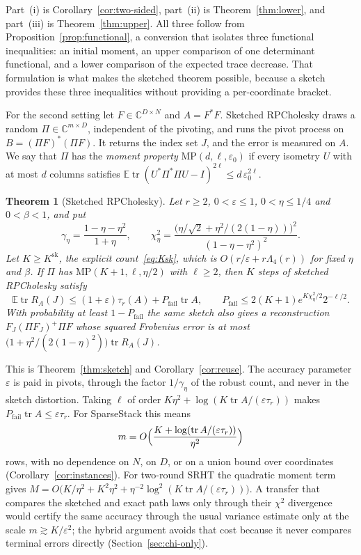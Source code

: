 \documentclass[11pt]{article}
\newtheorem{theorem}{Theorem}[section]
\theoremstyle{definition}\newtheorem{definition}[theorem]{Definition}
\theoremstyle{remark}\newtheorem{remark}[theorem]{Remark}
\newcommand{\C}{\mathbb C}
\newcommand{\E}{\mathbb E}
\newcommand{\eps}{\varepsilon}
\newcommand{\tr}{\operatorname{tr}}
\newcommand{\1}{\mathbf 1}
\newcommand{\MP}{\mathrm{MP}}
\newcommand{\Pfail}{P_{\mathrm{fail}}}
\begin{document}
Part~(i) is Corollary~\ref{cor:two-sided}, part~(ii) is
Theorem~\ref{thm:lower}, and part~(iii) is Theorem~\ref{thm:upper}. All
three follow from Proposition~\ref{prop:functional}, a conversion that
isolates three functional inequalities: an initial moment, an upper
comparison of one determinant functional, and a lower comparison of the
expected trace decrease. That formulation is what makes the sketched
theorem possible, because a sketch provides these three inequalities
without providing a per-coordinate bracket.

For the second setting let $F\in\C^{D\times N}$ and $A=F^*F$. Sketched
RPCholesky draws a random $\Pi\in\C^{m\times D}$, independent of the
pivoting, and runs the pivot process on $B=(\Pi F)^*(\Pi F)$. It returns
the index set $J$, and the error is measured on $A$. We say that $\Pi$
has the \emph{moment property} $\MP(d,\ell,\eps_0)$ if every isometry $U$
with at most $d$ columns satisfies
$\E\tr(U^*\Pi^*\Pi U-I)^{2\ell}\le d\,\eps_0^{2\ell}$.

\begin{theorem}[Sketched RPCholesky]\label{thm:intro-sketch}
Let $r\ge2$, $0<\eps\le1$, $0<\eta\le1/4$ and $0<\beta<1$, and put
\[
 \gamma_\eta=\frac{1-\eta-\eta^2}{1+\eta},\qquad
 \chi_\eta^2=\frac{\bigl(\eta/\sqrt2+\eta^2/(2(1-\eta))\bigr)^2}{(1-\eta-\eta^2)^2}.
\]
Let $K\ge K^{\mathrm{sk}}$, the explicit count~\eqref{eq:Ksk}, which is
$O(r/\eps+r\Lambda_4(r))$ for fixed $\eta$ and $\beta$. If $\Pi$ has
$\MP(K+1,\ell,\eta/2)$ with $\ell\ge2$, then $K$ steps of sketched
RPCholesky satisfy
\[
 \E\tr R_A(J)\le(1+\eps)\tau_r(A)+\Pfail\tr A,\qquad
 \Pfail\le2(K+1)e^{K\chi_\eta^2/2}2^{-\ell/2}.
\]
With probability at least $1-\Pfail$ the same sketch also gives a
reconstruction $F_J(\Pi F_J)^+\Pi F$ whose squared Frobenius error is at
most $\bigl(1+\eta^2/(2(1-\eta)^2)\bigr)\tr R_A(J)$.
\end{theorem}

This is Theorem~\ref{thm:sketch} and Corollary~\ref{cor:reuse}. The
accuracy parameter $\eps$ is paid in pivots, through the factor
$1/\gamma_\eta$ of the robust count, and never in the sketch distortion.
Taking $\ell$ of order $K\eta^2+\log(K\tr A/(\eps\tau_r))$ makes
$\Pfail\tr A\le\eps\tau_r$. For SparseStack this means
\[
 m=O\Bigl(\frac{K+\log(\tr A/(\eps\tau_r))}{\eta^2}\Bigr)
\]
rows, with no dependence on $N$, on $D$, or on a union bound over
coordinates (Corollary~\ref{cor:instances}). For two-round SRHT the
quadratic moment term gives
$M=O\bigl(K/\eta^2+K^2\eta^2+\eta^{-2}\log^2(K\tr A/(\eps\tau_r))\bigr)$.
A transfer that compares the sketched and exact path laws only through
their $\chi^2$ divergence would certify the same accuracy through the
usual variance estimate only at the scale $m\gtrsim K/\eps^2$; the hybrid
argument avoids that cost because it never compares terminal errors
directly (Section~\ref{sec:chi-only}).
\end{document}
